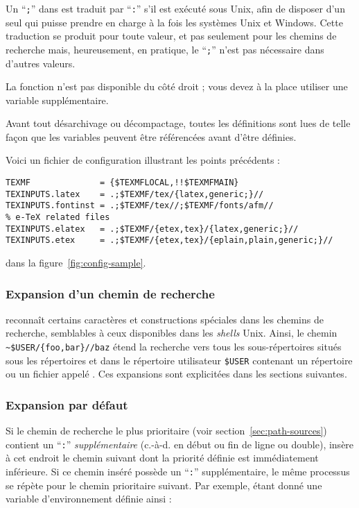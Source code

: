 \documentclass[german, english, french]{article}
\renewcommand{\samp}[1]{\enquote{\texttt{#1}}}
\begin{document}
\begin{itemize*}
  Un \samp{;} dans  est traduit par \samp{:} s'il est exécuté sous
  Unix, afin de disposer d'un seul  qui puisse prendre en charge à la
  fois les systèmes Unix et Windows. Cette traduction se produit pour toute
  valeur, et pas seulement pour les chemins de recherche mais, heureusement, en
  pratique, le \samp{;} n'est pas nécessaire dans d'autres valeurs.

  La fonction  n'est pas disponible du côté droit ;
  vous devez à la place utiliser une variable supplémentaire.
\item Avant tout désarchivage ou décompactage, toutes les définitions sont lues
  de telle façon que les variables peuvent être référencées avant d'être
  définies.
\end{itemize*}
Voici un fichier de configuration illustrant les points précédents :
\ifSingleColumn

\begin{verbatim}
TEXMF              = {$TEXMFLOCAL,!!$TEXMFMAIN}
TEXINPUTS.latex    = .;$TEXMF/tex/{latex,generic;}//
TEXINPUTS.fontinst = .;$TEXMF/tex//;$TEXMF/fonts/afm//
% e-TeX related files
TEXINPUTS.elatex   = .;$TEXMF/{etex,tex}/{latex,generic;}//
TEXINPUTS.etex     = .;$TEXMF/{etex,tex}/{eplain,plain,generic;}//
\end{verbatim}

\else dans la figure~\ref{fig:config-sample}.  \fi

\subsubsection{Expansion d'un chemin de recherche}
\label{sec:path-expansion}

\KPS{} reconnaît certains caractères et constructions spéciales dans les chemins
de recherche, semblables à ceux disponibles dans les \textit{shells}
Unix. Ainsi, le chemin \verb+~$USER/{foo,bar}//baz+ %
étend la recherche vers tous les sous-répertoires situés sous les répertoires
 et  dans le répertoire utilisateur \texttt{\$USER}
contenant un répertoire ou un fichier appelé %
. Ces expansions sont explicitées dans les sections suivantes.

\subsubsection{Expansion par défaut}
\label{sec:default-expansion}

Si le chemin de recherche le plus prioritaire (voir
section~\ref{sec:path-sources}) contient un \samp{:} \emph{supplémentaire}
(\mbox{c.-à-d.} en début ou fin de ligne ou double), \KPS{} insère à cet endroit
le chemin suivant dont la priorité définie est immédiatement inférieure. Si ce
chemin inséré possède un \samp{:} supplémentaire, le même processus se répète
pour le chemin prioritaire suivant.  Par exemple, étant donné une variable
d'environnement définie ainsi :
\end{document}
